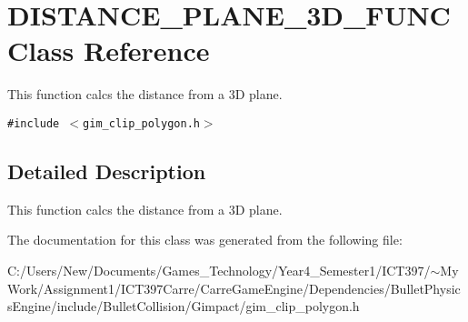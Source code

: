 \hypertarget{class_d_i_s_t_a_n_c_e___p_l_a_n_e__3_d___f_u_n_c}{
\section{DISTANCE\_\-PLANE\_\-3D\_\-FUNC Class Reference}
\label{class_d_i_s_t_a_n_c_e___p_l_a_n_e__3_d___f_u_n_c}
}
This function calcs the distance from a 3D plane.  


{\tt \#include $<$gim\_\-clip\_\-polygon.h$>$}



\subsection{Detailed Description}
This function calcs the distance from a 3D plane. 

The documentation for this class was generated from the following file:\begin{CompactItemize}
\item 
C:/Users/New/Documents/Games\_\-Technology/Year4\_\-Semester1/ICT397/$\sim$My Work/Assignment1/ICT397Carre/CarreGameEngine/Dependencies/BulletPhysicsEngine/include/BulletCollision/Gimpact/gim\_\-clip\_\-polygon.h\end{CompactItemize}
